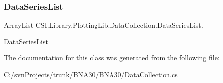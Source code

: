 \mbox{\label{class_c_s_i_1_1_library_1_1_plotting_lib_1_1_data_collection_a142bef1ecac01965be2f829f84e5d7d1}} 
\subsubsection{\texorpdfstring{DataSeriesList}{DataSeriesList}}
{\footnotesize\ttfamily Array\+List C\+S\+I.\+Library.\+Plotting\+Lib.\+Data\+Collection.\+Data\+Series\+List\hspace{0.3cm}{\ttfamily [get]}, {\ttfamily [set]}}



Data\+Series\+List 



The documentation for this class was generated from the following file\+:\begin{DoxyCompactItemize}
\item 
C\+:/svn\+Projects/trunk/\+B\+N\+A30/\+B\+N\+A30/Data\+Collection.\+cs\end{DoxyCompactItemize}
